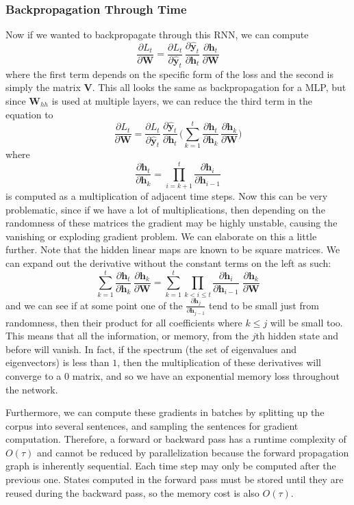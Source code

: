 \documentclass{article}
\theoremstyle{definition}
\theoremstyle{remark}
\theoremstyle{definition}
\begin{document}
\subsubsection{Backpropagation Through Time}

Now if we wanted to backpropagate through this RNN, we can compute 
\[\frac{\partial L_t}{\partial \mathbf{W}} = \frac{\partial L_t}{\partial \hat{\mathbf{y}}_t} \, \frac{\partial \hat{\mathbf{y}}_t}{\partial \mathbf{h}_t} \, \frac{\partial \mathbf{h}_t}{\partial \mathbf{W}}\]
where the first term depends on the specific form of the loss and the second is simply the matrix $\mathbf{V}$. This all looks the same as backpropagation for a MLP, but since $\mathbf{W}_{hh}$ is used at multiple layers, we can reduce the third term in the equation to 
\[\frac{\partial L_t}{\partial \mathbf{W}} = \frac{\partial L_t}{\partial \hat{\mathbf{y}}_t} \, \frac{\partial \hat{\mathbf{y}}_t}{\partial \mathbf{h}_t} \, \bigg(\sum_{k=1}^t \frac{\partial \mathbf{h}_t}{\partial \mathbf{h}_k} \, \frac{\partial \mathbf{h}_k}{\partial \mathbf{W}} \bigg)\]
where 
\[\frac{\partial \mathbf{h}_t}{\partial \mathbf{h}_k}  = \prod_{i=k+1}^{t} \frac{\partial \mathbf{h}_i}{\partial \mathbf{h}_{i-1}}\]
is computed as a multiplication of adjacent time steps. Now this can be very problematic, since if we have a lot of multiplications, then depending on the randomness of these matrices the gradient may be highly unstable, causing the vanishing or exploding gradient problem. We can elaborate on this a little further. Note that the hidden linear maps are known to be square matrices. We can expand out the derivative without the constant terms on the left as such: 
\[\sum_{k=1}^t \frac{\partial \mathbf{h}_t}{\partial \mathbf{h}_k} \, \frac{\partial \mathbf{h}_k}{\partial \mathbf{W}} = \sum_{k=1}^t \prod_{k < i \leq t} \frac{\partial \mathbf{h}_i}{\partial \mathbf{h}_{i-1}} \; \frac{\partial \mathbf{h}_k}{\partial \mathbf{W}}\]
and we can see if at some point one of the $\frac{\partial \mathbf{h}_j}{\partial \mathbf{h}_{j-1}}$ tend to be small just from randomness, then their product for all coefficients where $k \leq j$ will be small too. This means that all the information, or memory, from the $j$th hidden state and before will vanish. In fact, if the spectrum (the set of eigenvalues and eigenvectors) is less than $1$, then the multiplication of these derivatives will converge to a $0$ matrix, and so we have an exponential memory loss throughout the network. 

Furthermore, we can compute these gradients in batches by splitting up the corpus into several sentences, and sampling the sentences for gradient computation. Therefore, a forward or backward pass has a runtime complexity of $O(\tau)$ and cannot be reduced by parallelization because the forward propagation graph is inherently sequential. Each time step may only be computed after the previous one. States computed in the forward pass must be stored until they are reused during the backward pass, so the memory cost is also $O(\tau)$. 
\end{document}
